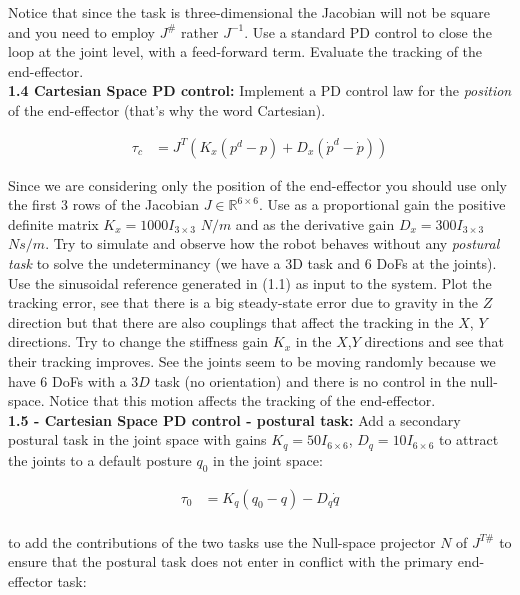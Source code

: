 \documentclass[11pt]{article}
\newcommand{\Rnum}{\mathbb{R}} %
\begin{document}
Notice that since the task is three-dimensional the Jacobian will not be square and you need to employ $J^{\#}$ rather $J^{-1}$.
Use a standard PD control to close the loop at the joint level, with a feed-forward term. Evaluate the tracking of the end-effector.\\



\textbf{1.4  Cartesian Space PD control:}
Implement a PD control law for the \textit{position} of the end-effector (that's why the word Cartesian). 


\begin{align}
\tau_c & = J^T\left(K_x(p^d - p) + D_x(\dot{p}^d -\dot{p})\right)
\end{align}

Since we are considering only the position of the end-effector you should use only the first 3 rows of the Jacobian $J \in \Rnum^{6 \times 6}$. 
Use  as  a proportional gain the positive definite matrix $K_x = 1000I_{3\times3}$ $N/m$ and as the derivative gain $D_x  = 300I_{3\times3}$ $Ns/m$. 
Try to simulate and observe how the robot behaves without any \textit{postural task} 
to solve the undeterminancy (we have a 3D task and 6 DoFs at the joints).
Use the sinusoidal reference generated in (1.1) as input to the system. Plot the tracking error, see that there is a big steady-state error due to gravity in the $Z$ direction but that there are also couplings that affect  the tracking in the 
$X$, $Y$ directions. Try to change the stiffness gain $K_x$ in the $X$,$Y$ directions and see that their tracking improves. See the joints seem to be moving randomly because we have 6 DoFs with a $3D$ task (no orientation) and there is no control in the null-space. Notice that this motion affects the tracking of the end-effector. \\


\textbf{1.5 - Cartesian Space PD control - postural task:}
Add  a secondary postural task in the joint space with  gains $K_q= 50 I_{6 \times6}$,   $D_q = 10I_{6 \times6}$ to attract the joints to a default posture $q_0$ in the joint space:

\begin{align}
\tau_0& = K_q(q_0-q) - D_q\dot{q}\\
\end{align}

to add the contributions of the two  tasks use the Null-space projector $N$ of $J^{T\#}$ to ensure that the postural task does not enter in conflict with the primary end-effector task:
\end{document}
